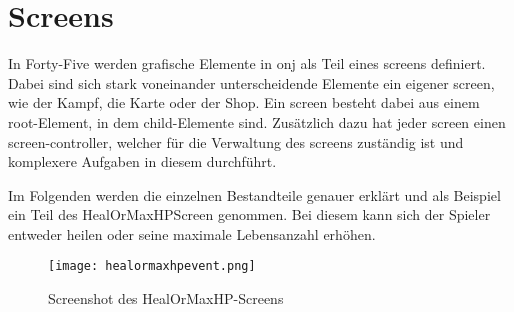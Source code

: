 \renewcommand{\kapitelautor}{Autor: Felix Zwickelstorfer}
\section{Screens}\label{sec:screens}
\renewcommand{\kapitelautor}{Autor: Felix Zwickelstorfer}
In Forty-Five werden grafische Elemente in onj als Teil eines screens definiert.
Dabei sind sich stark voneinander unterscheidende Elemente ein eigener screen, wie \zB der Kampf, die Karte oder der Shop.
Ein screen besteht dabei aus einem root-Element, in dem child-Elemente sind.
Zusätzlich dazu hat jeder screen einen screen-controller, welcher für die Verwaltung des screens zuständig ist und komplexere Aufgaben in diesem durchführt.

Im Folgenden werden die einzelnen Bestandteile genauer erklärt und als Beispiel ein Teil des HealOrMaxHPScreen genommen.
Bei diesem kann sich der Spieler entweder heilen oder seine maximale Lebensanzahl erhöhen.
\begin{figure}[H]
    \centering
    \texttt{[image: healormaxhpevent.png]}
    \caption{Screenshot des HealOrMaxHP-Screens}
\end{figure}




